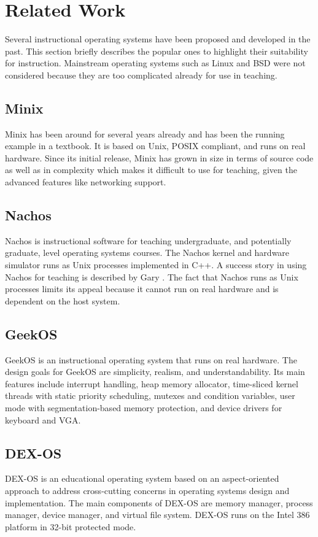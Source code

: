 \documentclass{acm_proc_article-sp}
\begin{document}
\section{Related Work}
Several instructional operating systems have been proposed and developed in 
the past\cite{anderson:survey}. This section briefly describes the popular ones to highlight their suitability for instruction. Mainstream operating systems 
such as Linux and BSD were not considered because they are too complicated 
already for use in teaching.

\subsection{Minix}
Minix\cite{tanenbaum:minix} has been around for several years already and has 
been the running example in a textbook\cite{tanenbaum:osdai}. It is based
on Unix, POSIX compliant, and runs on real hardware. Since its initial release,
Minix has grown in size in terms of source code as well as in complexity 
which makes it difficult to use for teaching, given the advanced features like 
networking support.

\subsection{Nachos}
Nachos\cite{christopher:nachos} is instructional software for teaching 
undergraduate, and potentially graduate, level operating systems courses.
The Nachos kernel and hardware simulator runs as Unix processes implemented
in C++. A success story in using Nachos for teaching is described by Gary
\cite{gary:nachos}. The fact that Nachos runs as Unix processes limits 
its appeal because it cannot run on real hardware and is dependent on the
host system.

\subsection{GeekOS}
GeekOS\cite{hovemeyer:geekos} is an instructional operating system that
runs on real hardware. The design goals for GeekOS are simplicity, realism,
and understandability. Its main features include interrupt handling, 
heap memory allocator, time-sliced kernel threads with static priority
scheduling, mutexes and condition variables, user mode with segmentation-based
memory protection, and device drivers for keyboard and VGA.


\subsection{DEX-OS}
DEX-OS\cite{dayo:dexos,dexos:site} is an educational operating system based on
an aspect-oriented approach to address cross-cutting concerns in operating 
systems design and implementation. The main components of DEX-OS are memory 
manager, process manager, device manager, and virtual file system. DEX-OS runs
on the Intel 386 platform in 32-bit protected mode.
\end{document}
